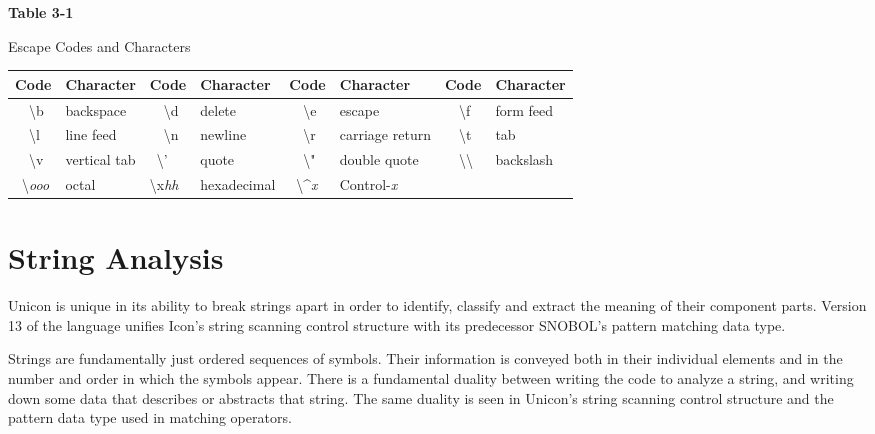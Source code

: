 \medskip

\begin{center}
{\sffamily\bfseries
Table 3-1

Escape Codes and Characters 
}
\end{center}

\begin{center}
\begin{xtabular}{|m{0.38in}|m{0.8in}|m{0.4in}|m{0.855in}|m{0.38in}|m{1.14in}|m{0.38in}|m{0.68in}|}
\hline
\sffamily\bfseries Code &
\sffamily\bfseries Character &
\sffamily\bfseries Code &
\sffamily\bfseries Character &
\sffamily\bfseries Code &
\sffamily\bfseries Character &
\sffamily\bfseries Code &
\sffamily\bfseries Character\\\hline
\ \ {\textbackslash}b &
backspace &
\ \ {\textbackslash}d &
delete &
\ \ {\textbackslash}e &
escape &
\ \ {\textbackslash}f &
form feed\\\hline
\ \ {\textbackslash}l &
line feed &
\ \ {\textbackslash}n &
newline &
\ \ {\textbackslash}r &
carriage return &
\ \ {\textbackslash}t &
tab\\\hline
\ \ {\textbackslash}v &
vertical tab &
\ {\textbackslash}' &
quote &
\ \ {\textbackslash}" &
double quote &
\ \ {\textbackslash}{\textbackslash} &
backslash\\\hline
\ {\textbackslash}\textit{ooo} &
octal &
{\textbackslash}x\textit{hh} &
hexadecimal  &
\ {\textbackslash}\^{}\textit{x} &
Control-\textit{x} &
~
 &
~
\\\hline
\end{xtabular}
\end{center}

\section{String Analysis}

Unicon is unique in its ability to break strings apart in order to
identify, classify and extract the meaning of their component parts.
Version 13 of the language unifies Icon's string scanning control
structure with its predecessor SNOBOL's pattern matching data type. 

Strings are fundamentally just ordered sequences of symbols. Their
information is conveyed both in their individual elements and in
the number and order in which the symbols appear.
There is a fundamental duality between writing the code to analyze a
string, and writing down some data that describes or abstracts
that string. The same duality is seen in Unicon's string scanning
control structure and the pattern data type used in matching
operators.


